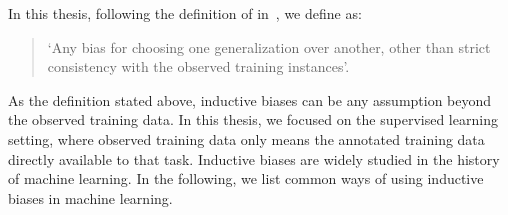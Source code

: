 
In this thesis, following the definition of 
in~\cite{mitchell1980need}, we define  as:

\begin{quote}
  \label{def:bias}
  `Any bias for choosing one generalization over another, other than
  strict consistency with the observed training instances'.
\end{quote}


As the definition stated above, inductive biases can be any assumption
beyond the observed training data. In this thesis, we focused on the
supervised learning setting, where observed training data only means
the annotated training data directly available to that task. Inductive
biases are widely studied in the history of machine learning. In the
following, we list common ways of using inductive biases in
machine learning.


